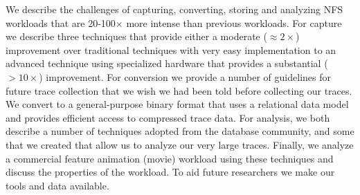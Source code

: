 We describe the challenges of capturing, converting, storing and
analyzing NFS workloads that are 20-100$\times$ more intense than previous
workloads.  For capture we describe three techniques that provide
either a moderate ($\approx{}2\times$) improvement over traditional
techniques with very easy implementation to an advanced technique
using specialized hardware that provides a substantial ($>10\times$)
improvement.  For conversion we
provide a number of guidelines for future trace collection that we
wish we had been told before collecting our traces.  We convert 
to a general-purpose binary format that uses a relational data
model and provides efficient access to compressed trace data.  For
analysis, we both describe a number of techniques adopted from the
database community, and some that we created that allow us to analyze
our very large traces.  Finally, we analyze a commercial feature
animation (movie) workload using these techniques and discuss the
properties of the workload.  To aid future researchers we make our
tools and data available.
